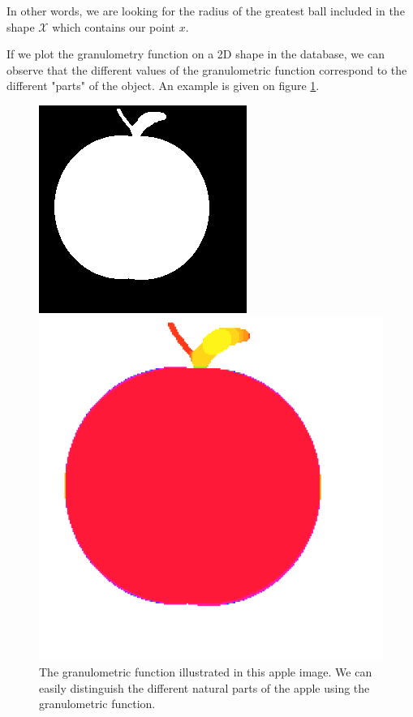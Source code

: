 In other words, we are looking for the radius of the greatest ball included in the shape $\mathcal{X}$ which contains our point $x$.

If we plot the granulometry function on a 2D shape in the database, we can observe that the different values of the granulometric function correspond to the different "parts" of the object. An example is given on figure \ref{apple-granulo}.


\begin{figure}[!ht]
	\begin{center}
    	\begin{minipage}[c]{.46\linewidth}
    		\includegraphics[scale=0.56]{images/apple-1.png}
    	\end{minipage} \hfill
    	\begin{minipage}[c]{.46\linewidth}
    		\includegraphics[scale=0.02]{images/apple-1-granulo.pdf}
    	\end{minipage}
	\end{center}
	\label{apple-granulo}
	\caption{The granulometric function illustrated in this apple image. We can easily distinguish the different natural parts of the apple using the granulometric function.}
\end{figure}

